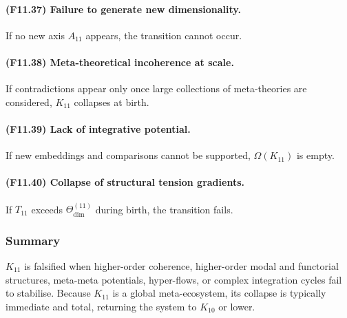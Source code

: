 \paragraph{(F11.37) Failure to generate new dimensionality.}
If no new axis $A_{11}$ appears,
the transition cannot occur.

\paragraph{(F11.38) Meta-theoretical incoherence at scale.}
If contradictions appear only once large collections of meta-theories are considered,
$K_{11}$ collapses at birth.

\paragraph{(F11.39) Lack of integrative potential.}
If new embeddings and comparisons cannot be supported,
$\Omega(K_{11})$ is empty.

\paragraph{(F11.40) Collapse of structural tension gradients.}
If $T_{11}$ exceeds $\Theta_{\mathrm{dim}}^{(11)}$ during birth,
the transition fails.



\subsubsection{Summary}

$K_{11}$ is falsified when higher-order coherence, higher-order modal and
functorial structures, meta-meta potentials, hyper-flows, or complex
integration cycles fail to stabilise. Because $K_{11}$ is a global
meta-ecosystem, its collapse is typically immediate and total, returning
the system to $K_{10}$ or lower.
